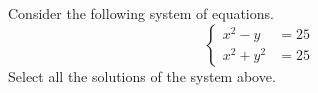 \documentclass{ximera}
\author{Kenneth Berglund}
\begin{document}
\begin{exercise}
Consider the following system of equations.
$$
\begin{cases}
x^2 - y & = 25 \\
x^2 + y^2 & = 25
\end{cases}
$$
Select all the solutions of the system above.
\begin{selectAll}
\end{selectAll}

\end{exercise}
\end{document}
